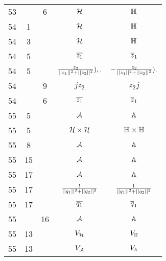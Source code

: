 \documentclass[a4paper,11pt]{article}
\begin{document}
\begin{center}
\begin{tabular}{|c|c|c|c|c|}
    53  & &  6 & $\mathcal{H}$ & $\mathbb{H}$ \\
    54  &  1 & & $\mathcal{H}$ & $\mathbb{H}$ \\
    54  &  3 & & $\mathcal{H}$ & $\mathbb{H}$ \\
    54  &  5 & & $\overline{ z_{ 1 } }$ & $\overline{ z }_{ 1 }$ \\
    54  &  5 & & $\frac{ z_{ 2 } }{ || z_{ 1 } ||^{ 2 } + || z_{ 2 } ||^{ 2 } } ),.$
           & $-\frac{ z_{ 2 } }{ || z_{ 1 } ||^{ 2 } + || z_{ 2 } ||^{ 2 } } ).$ \\
    54  & &  9 & $j z_{ 2 }$ & $z_{ 2 } j$ \\
    54  & &  6 & $\overline{ z_{ 1 } }$ & $\overline{ z }_{ 1 }$ \\
    55  &  5 & & $\mathcal{A}$ & $\mathbb{A}$ \\
    55  &  5 & & $\mathcal{H} \times \mathcal{H}$ & $\mathbb{H} \times \mathbb{H}$ \\
    55  &  8 & & $\mathcal{A}$ & $\mathbb{A}$ \\
    55  & 15 & & $\mathcal{A}$ & $\mathbb{A}$ \\
    55  & 17 & & $\mathcal{A}$ & $\mathbb{A}$ \\
    55  & 17 & & $\frac{ ! }{ || q_{ 1 } ||^{ 2 } + || q_{ 2 } ||^{ 2 } }$
           & $\frac{ 1 }{ || q_{ 1 } ||^{ 2 } + || q_{ 2 } ||^{ 2 } }$ \\
    55  & 17 & & $\overline{ q_{ 1 } }$ & $\overline{ q }_{ 1 }$ \\
    55  & & 16 & $\mathcal{A}$ & $\mathbb{A}$ \\
    55  & 13 & & $V_{ \mathcal{H} }$ & $V_{ \mathbb{H} }$ \\
    55  & 13 & & $V_{ \mathcal{A} }$ & $V_{ \mathbb{A} }$ \\
    \hline
  \end{tabular}


\end{center}
\end{document}
